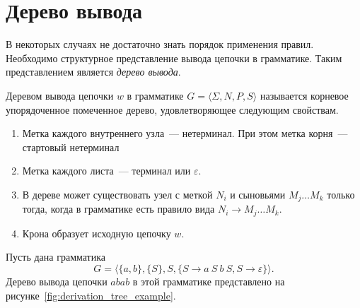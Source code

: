 \section{Дерево вывода}
\label{sec:DerivTree}

В некоторых случаях не достаточно знать порядок применения правил.
Необходимо структурное представление вывода цепочки в грамматике.
Таким представлением является \emph{дерево вывода}.

\begin{definition}
    Деревом вывода цепочки $w$ в грамматике $G = \langle \Sigma, N, P, S \rangle$ называется корневое упорядоченное помеченное дерево, удовлетворяющее следующим свойствам.
    \begin{enumerate}
        \item Метка каждого внутреннего узла~--- нетерминал. При этом метка корня~--- стартовый нетерминал
        \item Метка каждого листа~--- терминал или $\varepsilon$.
        \item В дереве может существовать узел с меткой $N_i$ и сыновьями $M_j \dots M_k$ только тогда, когда в грамматике есть правило вида $N_i \to M_j \dots M_k$.
        \item Крона образует исходную цепочку $w$.
    \end{enumerate}
\end{definition}

\begin{example}
    \label{exmpl:derivation_tree}
    Пусть дана грамматика
    \begin{equation}
        G = \langle \{a,b\}, \{S\}, S, \{S \to a \ S \ b \ S, S \to \varepsilon\} \rangle.\label{eq:grammar}
    \end{equation}
    Дерево вывода цепочки $abab$ в этой грамматике представлено на рисунке~\ref{fig:derivation_tree_example}.

    \begin{marginfigure}
        \begin{center}
            \resizebox{\marginparwidth}{!}{}
        \end{center}
        \caption{Дерева вывода цепочки $abab$ в грамматике~\ref{eq:grammar}}
        \label{fig:derivation_tree_example}
    \end{marginfigure}

\end{example}

